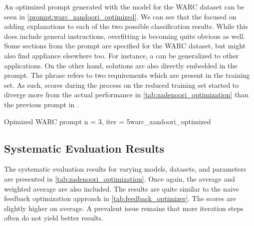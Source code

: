 An optimized prompt generated with the \gpt model for the WARC dataset can be seen in \autoref{prompt:warc_zandoori_optimized}.
We can see that the \LLM focused on adding explanations to each of the two possible classification results.
While this does include general instructions, overfitting is becoming quite obvious as well.
Some sections from the prompt are specified for the WARC dataset, but might also find appliance elsewhere too.
For instance, a  can be generalized to other applications.
On the other hand, solutions are also directly embedded in the prompt.
The phrase  refers to two requirements which are present in the training set.
As such, \fone scores during the \APE process on the reduced training set started to diverge more from the actual performance in \autoref{tab:zadenoori_optimization} than the previous prompt in .

\begin{prompt}{Opimized WARC prompt n = 3, iter = 5}{warc_zandoori_optimized}
    \\
    
\end{prompt}

\subsection{Systematic Evaluation Results}
\label{subsec:Evaluation:varying-the-optimization-prompt:systematic-evaluation-results}

The systematic evaluation results for varying models, datasets, and parameters are presented in \autoref{tab:zadenoori_optimization}.
Once again, the average and weighted average are also included.
The results are quite similar to the naive feedback optimization approach in \autoref{tab:feedback_optimizer}.
The \fone scores are slightly higher on average.
A prevalent issue remains that more iteration steps often do not yield better results.

\begin{table}
    \centering
    \renewcommand{\arraystretch}{1.4}
    
    \renewcommand{\arraystretch}{1}
    \caption{Naive prompt optimization approach using the optimization prompt by }
    \label{tab:zadenoori_optimization}
\end{table}